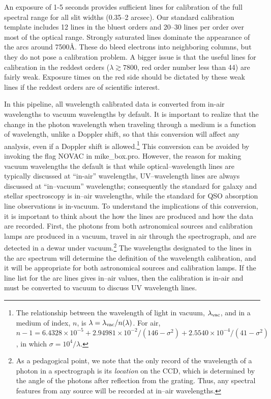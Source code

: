 \documentclass[12pt,preprint]{aastex}
\begin{document}
An exposure of 1-5 seconds provides sufficient lines for calibration
of the full spectral range for all slit widths (0.35--2 arcsec).  Our
standard calibration template includes 12 lines in the bluest orders
and 20--30 lines per order over most of the optical range.  Strongly
saturated lines dominate the appearance of the arcs around
7500\AA. These do bleed electrons into neighboring columns, but
they do not pose a calibration problem.  A bigger issue is that the
useful lines for calibration in the reddest orders 
($\lambda \gtrsim 7800$, 
red order number less than 44) are fairly weak.  Exposure times on the
red side should be dictated by these weak lines if the reddest orders
are of scientific interest.

In this pipeline, all wavelength calibrated data is converted from
in-air wavelengths to vacuum wavelengths by default.  It is important
to realize that the change in the photon wavelength when traveling
through a medium is a function of wavelength, unlike a Doppler shift,
so that this conversion will affect any analysis, even if a Doppler
shift is allowed.\footnote{The relationship between the wavelength of
  light in vacuum, $\lambda_{\rm vac}$, and in a medium of index, $n$,
  is $\lambda = \lambda_{\rm vac}/n(\lambda)$.  For air, $n-1 =
  6.4328\times 10^{-5} + 2.94981\times 10^{-2}/(146-\sigma^2) +
  2.5540\times 10^{-4}/(41-\sigma^2)$, in which $\sigma=10^4/\lambda$.}
This conversion can be avoided by invoking the
flag NOVAC in mike\_box.pro.  However, the reason for making vacuum
wavelengths the default is that while optical--wavelength lines are
typically discussed at ``in-air'' wavelengths, UV--wavelength lines
are always discussed at ``in--vacuum'' wavelengths; consequently the
standard for galaxy and stellar spectroscopy is in--air wavelengths,
while the standard for QSO absorption line observations is in-vacuum.
To understand the implications of this conversion, it is important to
think about the how the lines are produced and how the data are
recorded.  First, the photons from both astronomical sources and
calibration lamps are produced in a vacuum, travel in air through the
spectrograph, and are detected in a dewar under vacuum.\footnote{As a
  pedagogical point, we note that the only record of the wavelength of
  a photon in a spectrograph is its {\it location} on the CCD, which
  is determined by the angle of the photons after reflection from the
  grating.  Thus, any spectral features from any source will be
  recorded at in--air wavelengths.}  The wavelengths designated to the
lines in the arc spectrum will determine the definition of the
wavelength calibration, and it will be appropriate for both
astronomical sources and calibration lamps.  If the line list for the
arc lines gives in--air values, then the calibration is in-air and
must be converted to vacuum to discuss UV wavelength lines.  
\end{document}
